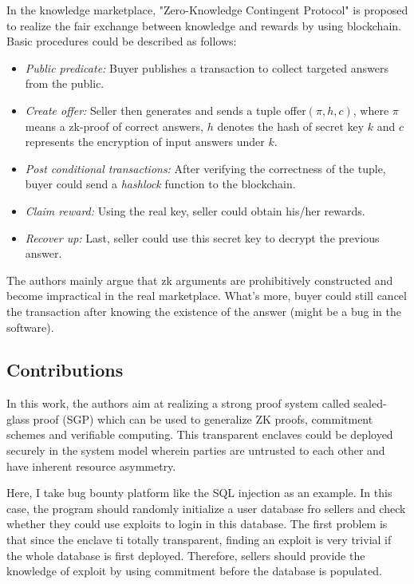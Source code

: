 \documentclass[conference]{IEEEtran}
\begin{document}
In the knowledge marketplace, "Zero-Knowledge Contingent Protocol" is proposed to realize the fair exchange between knowledge and rewards by using blockchain.
%
Basic procedures could be described as follows:
\begin{itemize}
    \item \textit{Public predicate:} Buyer publishes a transaction to collect targeted answers from the public.
    \item \textit{Create offer:} Seller then generates and sends a tuple offer$(\pi,h,c)$, where $\pi$ means a zk-proof of correct answers, $h$ denotes the hash of secret key $k$ and $c$ represents the encryption of input answers under $k$.
    \item \textit{Post conditional transactions:} After verifying the correctness of the tuple, buyer could send a \textit{hashlock} function to the blockchain.
    \item \textit{Claim reward:} Using the real key, seller could obtain his/her rewards.
    \item \textit{Recover up:} Last, seller could use this secret key to decrypt the previous answer.
\end{itemize}

The authors mainly argue that zk arguments are prohibitively constructed and become impractical in the real marketplace.
%
What's more, buyer could still cancel the transaction after knowing the existence of the answer (might be a bug in the software). 

\subsection{Contributions}
In this work, the authors aim at realizing a strong proof system called sealed-glass proof (SGP) which can be used to generalize ZK proofs, commitment schemes and verifiable computing.
%
This transparent enclaves could be deployed securely in the system model wherein parties are untrusted to each other and have inherent resource asymmetry.

Here, I take bug bounty platform like the SQL injection as an example.
%
In this case, the program should randomly initialize a user database fro sellers and check whether they could use exploits to login in this database.
%
The first problem is that since the enclave ti totally transparent, finding an exploit is very trivial if the whole database is first deployed.
%
Therefore, sellers should provide the knowledge of exploit by using commitment before the database is populated.
\end{document}
